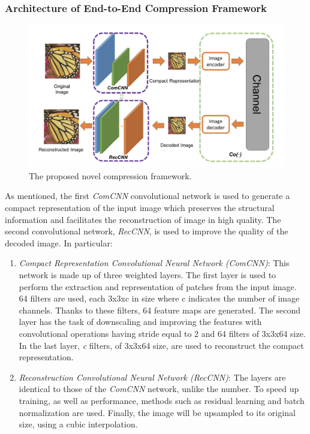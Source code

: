 \subsubsection{Architecture of End-to-End Compression Framework}
\begin{figure}[htbp]
    \centering
    \includegraphics[width = 0.8 \linewidth]{images/paper3/framework.png}
    \centering
    \caption{The proposed novel compression framework.}
    \label{fig:framework}
\end{figure}
As mentioned, the first \emph{ComCNN} convolutional network is used to generate 
a compact representation of the input image which preserves the structural 
information and facilitates the reconstruction of image in high quality. The 
second convolutional network, \emph{RecCNN}, is used to improve the quality of the 
decoded image. In particular:
\begin{enumerate}
    \item \emph{Compact Representation Convolutional Neural Network (ComCNN)}: 
    This network is made up of three weighted layers. The first layer is 
    used to perform the extraction and representation of patches from the 
    input image. 64 filters are used, each 3x3xc in size where c indicates 
    the number of image channels. Thanks to these filters, 64 feature maps 
    are generated. The second layer has the task of downscaling and improving 
    the features with convolutional operations having stride equal to 2 
    and 64 filters of 3x3x64 size. In the last layer, \emph{c} filters, of 3x3x64 
    size, are used to reconstruct the compact representation.
    \item \emph{Reconstruction Convolutional Neural Network (RecCNN)}: The layers 
    are identical to those of the \emph{ComCNN} network, unlike the number. To 
    speed up training, as well as performance, methods such as residual 
    learning and batch normalization \cite{0799924133} are used. Finally, the image will 
    be upsampled to its original size, using a cubic interpolation.
\end{enumerate}

